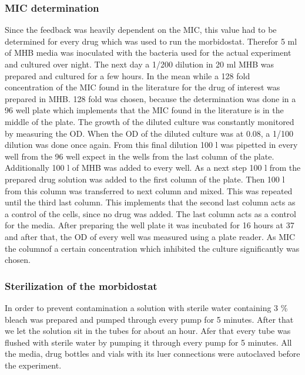 \subsubsection{MIC determination}
Since the feedback was heavily dependent on the MIC, this value had to be determined for every drug which was used to run the morbidostat. Therefor 5 ml of MHB media was inoculated with the bacteria used for the actual experiment and cultured over night. The next day a 1/200 dilution in 20 ml MHB was prepared and cultured for a few hours. In the mean while a 128 fold concentration of the MIC found in the literature for the drug of interest was prepared in MHB. 128 fold was chosen, because the determination was done in a 96 well plate which implements that the MIC found in the literature is in the middle of the plate. The growth of the diluted culture was constantly monitored by measuring the OD. When the OD of the diluted culture was at 0.08, a 1/100 dilution was done once again. From this final dilution 100 \textmu l was pipetted in every well from the 96 well expect in the wells from the last column of the plate. Additionally 100 \textmu l of MHB was added to every well. As a next step 100 \textmu l from the prepared drug solution was added to the first column of the plate. Then 100 \textmu l from this column was transferred to next column and mixed. This was repeated until the third last column. This implements that the second last column acts as a control of the cells, since no drug was added. The last column acts as a control for the media. After preparing the well plate it was incubated for 16 hours at 37 \degree \space and after that, the OD of every well was measured using a plate reader. As MIC the columnof a certain concentration which inhibited the culture significantly was chosen.
\label{section:mic_determination}


\subsubsection{Sterilization of the morbidostat}   
In order to prevent contamination a solution with sterile water containing 3 \% bleach was prepared and pumped through every pump for 5 minutes. After that we let the solution sit in the tubes for about an hour. Afer that every tube was flushed with sterile water by pumping it through every pump for 5 minutes. All the media, drug bottles and vials with its luer connections were autoclaved before the experiment.
\label{section:sterilization}

